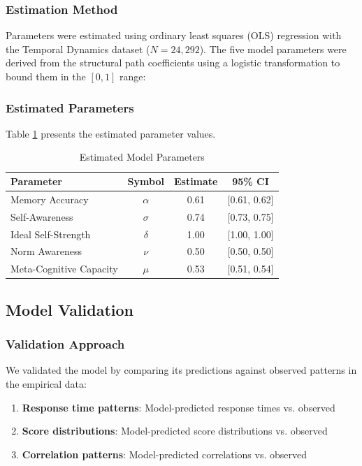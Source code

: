 \subsubsection{Estimation Method}

Parameters were estimated using ordinary least squares (OLS) regression with the Temporal Dynamics dataset ($N = 24{,}292$). The five model parameters were derived from the structural path coefficients using a logistic transformation to bound them in the $[0, 1]$ range:

\subsubsection{Estimated Parameters}

Table \ref{tab:parameters} presents the estimated parameter values.

\begin{table}[h]
\centering
\begin{tabular}{lccc}
\toprule
\textbf{Parameter} & \textbf{Symbol} & \textbf{Estimate} & \textbf{95\% CI} \\
\midrule
Memory Accuracy & $\alpha$ & 0.61 & [0.61, 0.62] \\
Self-Awareness & $\sigma$ & 0.74 & [0.73, 0.75] \\
Ideal Self-Strength & $\delta$ & 1.00 & [1.00, 1.00] \\
Norm Awareness & $\nu$ & 0.50 & [0.50, 0.50] \\
Meta-Cognitive Capacity & $\mu$ & 0.53 & [0.51, 0.54] \\
\bottomrule
\end{tabular}
\caption{Estimated Model Parameters}
\label{tab:parameters}
\end{table}

\subsection{Model Validation}

\subsubsection{Validation Approach}

We validated the model by comparing its predictions against observed patterns in the empirical data:

\begin{enumerate}
    \item \textbf{Response time patterns}: Model-predicted response times vs. observed
    \item \textbf{Score distributions}: Model-predicted score distributions vs. observed
    \item \textbf{Correlation patterns}: Model-predicted correlations vs. observed
\end{enumerate}

